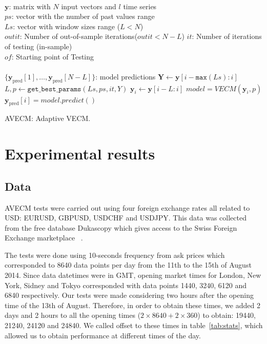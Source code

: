\begin{algorithm}[ht]
\begin{algorithmic}[1]
\REQUIRE $\,$ \\
$\mathbf{y}$: matrix with $N$ input vectors and $l$ time series\\
$ps$: vector with the number of past values range \\
$Ls$: vector with window sizes range ($L<N$) \\
$outit$: Number of out-of-sample iterations($outit < N-L$)
$it$: Number of iterations of testing (in-sample)\\
$of$: Starting point of Testing \\
\ENSURE  $\,$ \\
$\{ \mathbf{y}_{\text{pred}}[1],\dots,\mathbf{y}_{\text{pred}}[N-L]\}$: model predictions 
   \STATE $\mathbf{Y} \gets \mathbf{y}[i-\texttt{max}(Ls):i]$
    \STATE $L,p \gets
    \texttt{get\_best\_params}(Ls,ps,it,Y)$
    \STATE $\mathbf{y}_i \gets \mathbf{y}[i-L:i]$
        \STATE $model = VECM(\mathbf{y}_i, p)$
        \STATE $\mathbf{y}_{\text{pred}}[i] = model.predict()$
\ENDFOR
\end{algorithmic}
\caption{AVECM: Adaptive VECM.}
\label{alg:AVECM}
\end{algorithm}



\section{Experimental results}
\label{sec:results}
\subsection{Data} \label{sec:unitroot}
AVECM tests were carried out using four foreign exchange rates all related to
USD: EURUSD, GBPUSD, USDCHF and USDJPY. This data was collected from the free
database Dukascopy which gives access to the Swiss Foreign Exchange marketplace
~\cite{Dukascopy2014}.

The tests were done using 10-seconds frequency from ask prices which
corresponded to 8640 data points per day from the 11th to the 15th of August
2014. Since data datetimes were in GMT, opening market times for London, New
York, Sidney and Tokyo corresponded with data points 1440, 3240, 6120 and 6840
respectively. Our tests were made considering two hours after the opening time
of the 13th of August. Therefore, in order to obtain these times, we added 2
days and 2 hours to all the opening times ($2\times 8640 + 2 \times 360$) to obtain:
19440, 21240, 24120 and 24840. We called offset to these times in
table~\ref{tab:stats}, which allowed us to obtain performance at different
times of the day.

